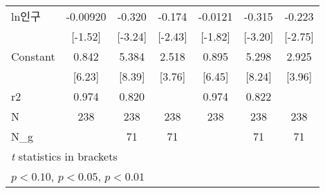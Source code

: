 \begin{table}[htbp]
\begin{tabular}{l*{6}{c}}
\addlinespace
ln인구            &    -0.00920         &      -0.320\sym{***}&      -0.174\sym{**} &     -0.0121\sym{*}  &      -0.315\sym{***}&      -0.223\sym{***}\\
                    &     [-1.52]         &     [-3.24]         &     [-2.43]         &     [-1.82]         &     [-3.20]         &     [-2.75]         \\
\addlinespace
Constant            &       0.842\sym{***}&       5.384\sym{***}&       2.518\sym{***}&       0.895\sym{***}&       5.298\sym{***}&       2.925\sym{***}\\
                    &      [6.23]         &      [8.39]         &      [3.76]         &      [6.45]         &      [8.24]         &      [3.96]         \\
\midrule
r2                  &       0.974         &       0.820         &                     &       0.974         &       0.822         &                     \\
N                   &         238         &         238         &         238         &         238         &         238         &         238         \\
N\_g                 &                     &          71         &          71         &                     &          71         &          71         \\
\bottomrule
\multicolumn{7}{l}{\footnotesize \textit{t} statistics in brackets}\\
\multicolumn{7}{l}{\footnotesize \sym{*} \(p<0.10\), \sym{**} \(p<0.05\), \sym{***} \(p<0.01\)}\\
\end{tabular}
\end{table}

